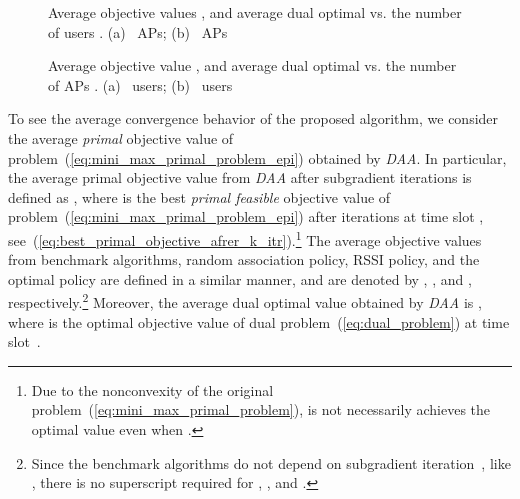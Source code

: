 \documentclass[journal, 10pt, twocolumn]{IEEEtran}
\begin{document}
\begin{figure}[t]
\centering
{}
\goodgap
{}\vspace{-2mm}
\caption{Average objective values , and average dual optimal   vs. the number of users . (a)~ APs; (b)~ APs}
\label{fig:Bound_illustration_all2}
\vspace{-0.4cm}
\end{figure}


\begin{figure}[t]
\centering
{}
\goodgap
{}\vspace{-2mm}
\caption{Average objective value , and average dual optimal  vs. the number of APs . (a)~ users; (b)~ users}
\label{fig:Bound_illustration_all3}
\vspace{-0.4cm}
\end{figure}

To see the average convergence behavior of the proposed algorithm, we consider the average \emph{primal} objective value of problem~(\ref{eq:mini_max_primal_problem_epi}) obtained by \emph{DAA}. In particular, the average primal objective value from \emph{DAA} after  subgradient iterations is defined as , where  is the best \emph{primal feasible} objective value of problem~(\ref{eq:mini_max_primal_problem_epi}) after  iterations at time slot , see~(\ref{eq:best_primal_objective_afrer_k_itr}).\footnote{Due to the nonconvexity of the original problem~(\ref{eq:mini_max_primal_problem}),  is not necessarily achieves the optimal value even when .} The average objective values from benchmark algorithms, random association policy, RSSI policy, and the optimal policy are defined in a similar manner, and are denoted by , , and , respectively.\footnote{Since the benchmark algorithms do not depend on subgradient iteration~, like , there is no superscript  required for , , and .} Moreover, the average dual optimal value obtained by \emph{DAA} is , where  is the optimal objective value of dual problem~(\ref{eq:dual_problem}) at time slot~.
\end{document}
